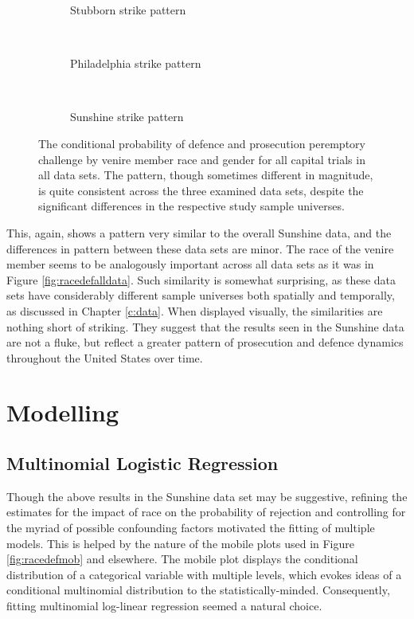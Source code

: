 \begin{figure}[h!]
  \centering
  \begin{subfigure}{0.4\textwidth}
    \caption{\footnotesize Stubborn strike pattern}
    \label{fig:stubcompgen}
  \end{subfigure}
  ~
  \begin{subfigure}{0.4\textwidth}
    \caption{\footnotesize Philadelphia strike pattern}
    \label{fig:philcompgen}
  \end{subfigure}
  ~
  \begin{subfigure}{0.4\textwidth}
    \caption{\footnotesize Sunshine strike pattern}
    \label{fig:suncompgen}
  \end{subfigure}
  \caption[Strikes by Race and Gender (All Capital Trial Data)]
  {\footnotesize The conditional probability of defence and prosecution peremptory challenge by venire member race and gender for
    all capital trials in all data sets. The pattern, though sometimes different in magnitude, is quite consistent across the three
    examined data sets, despite the significant differences in the respective study sample universes.}
  \label{fig:genderalldata}
\end{figure}

This, again, shows a pattern very similar to the overall Sunshine data, and the differences in pattern between these data sets are
minor. The race of the venire member seems to be analogously important across all data sets as it was in Figure
\ref{fig:racedefalldata}. Such similarity is somewhat surprising, as these data sets have considerably different sample
universes both spatially and temporally, as discussed in Chapter \ref{c:data}. When displayed visually, the similarities are
nothing short of striking. They suggest that the results seen in the Sunshine data are not a fluke, but reflect a greater pattern
of prosecution and defence dynamics throughout the United States over time.

\section{Modelling} \label{sec:mods}

\subsection{Multinomial Logistic Regression}

Though the above results in the Sunshine data set may be suggestive, refining the estimates for the impact of race on the
probability of rejection and controlling for the myriad of possible confounding factors motivated the fitting of multiple
models. This is helped by the nature of the mobile plots used in
Figure \ref{fig:racedefmob} and elsewhere. The mobile plot displays the
conditional distribution of a categorical variable with multiple levels, which evokes ideas of a conditional multinomial
distribution to the statistically-minded. Consequently, fitting multinomial log-linear regression seemed a natural choice.


